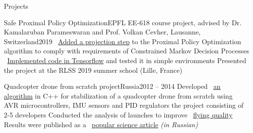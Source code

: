 \documentclass{resume} %
\newcommand*{\mybold}[1]{{\color{gray} #1}}
\newcommand{\mylink}{{\color{gray}\faExternalLink}}
\begin{document}
\begin{rSection}{Projects}

	\begin{rSubsection}{Safe Proximal Policy Optimization}{}{EPFL EE-618 course project, advised by Dr. Kamalaruban Parameswaran and Prof. Volkan Cevher, Lausanne, Switzerland}{2019}
		\myitem \mylink~\href{https://www.overleaf.com/read/cvxkswbspgpb}{Added a projection step} to the \mybold{Proximal Policy Optimization} algorithm to comply with requirements of \mybold{Constrained Markov Decision Processes}
		\myitem \mylink~\href{https://github.com/sergeivolodin/SafeContinuousStateRL}{Implemented code in Tensorflow} and tested it in simple environments
		\myitem Presented the project at the RLSS 2019 summer school (Lille, France)
	\end{rSubsection}

	\begin{rSubsection}{Quadcopter drone from scratch project}{}{Russia}{2012 -- 2014}
		\myitem Developed \mylink~\href{https://github.com/it-workshop/Quadrocopter}{an algorithm} in C++ for stabilization of a quadcopter drone from scratch using AVR microcontrollers, IMU sensors and PID regulators
		\myitem \mybold{Co-managed} the project consisting of 2-5 developers
		\myitem Conducted the analysis of launches to improve \mylink~\href{https://www.youtube.com/watch?v=AxDoO-gNRtc}{flying quality}
		\myitem Results were \mybold{published} as a \mylink~\href{http://web.archive.org/web/20141016114551/http://habrahabr.ru/company/technoworks/blog/216437/}{popular science article} {\em (in Russian)}
	\end{rSubsection}
\end{rSection}
\end{document}

